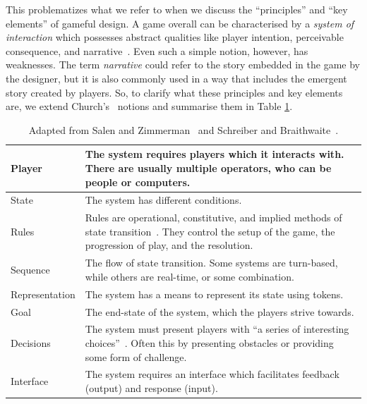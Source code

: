 \documentclass{sig-alternate-05-2015}
\begin{document}
This problematizes what we refer to when we discuss the ``principles'' and ``key elements'' of gameful design. A game overall can be characterised by a {\em system of interaction} which possesses abstract qualities like player intention, perceivable consequence, and narrative~\cite{church1999-formalAbstractDesignTools}. Even such a simple notion, however, has weaknesses. The term {\em narrative} could refer to the story embedded in the game by the designer, but it is also commonly used in a way that includes the emergent story created by players. So, to clarify what these principles and key elements are, we extend Church's~\cite{church1999-formalAbstractDesignTools} notions and summarise them in Table \ref{table:elements}.



\begin{table}[tb]
\begin{tabularx}{\linewidth}{|l|X|} \hline


Player&


The system requires players which it interacts with. There are usually multiple operators, who can be people or computers.\\ \hline


State&


The system has different conditions.\\ \hline


Rules&


Rules are operational, constitutive, and implied methods of state transition~\cite{salen2004rules}. They control the setup of the game, the progression of play, and the resolution.\\ \hline


Sequence&


The flow of state transition. Some systems are turn-based, while others are real-time, or some combination.\\ \hline


Representation&


The system has a means to represent its state using tokens.\\ \hline


Goal&


The end-state of the system, which the players strive towards.\\ \hline


Decisions&


The system must present players with ``a series of interesting choices''~\cite{meier2012-interestingChoices}. Often this by presenting obstacles or providing some form of challenge.\\ \hline


Interface&


The system requires an interface which facilitates feedback (output) and response (input).\\ \hline
\end{tabularx}
\caption{Adapted from Salen and Zimmerman~\cite{salen2004rules} and Schreiber and Braithwaite~\cite{schreiber2008challenges}.}
\label{table:elements}
\end{table}
\end{document}
